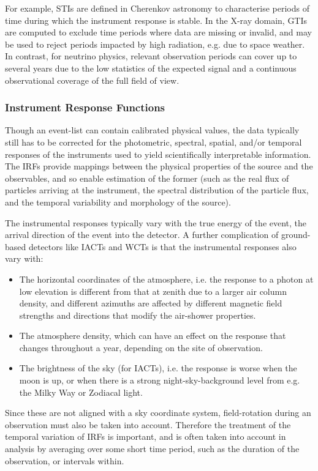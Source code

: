 \documentclass[11pt,a4paper]{ivoa}
\begin{document}
For example, \gls{STI}s are defined in Cherenkov astronomy to characterise periods of time during which the instrument response is stable. In the X-ray domain, \gls{GTI}s are computed to exclude time periods where data are missing or invalid, and may be used to reject periods impacted by high radiation, e.g. due to space weather. In contrast, for neutrino physics, relevant observation periods can cover up to several years due to the low statistics of the expected signal and a continuous observational coverage of the full field of view.


\subsubsection{Instrument Response Functions}

Though an event-list can contain calibrated physical values, the data typically still has to be corrected for the
photometric, spectral, spatial, and/or temporal responses of the instruments used to yield scientifically interpretable
information. The \gls{IRF}s provide mappings between the physical properties of the source and the observables, and so enable
estimation of the former (such as the real flux of particles arriving at the instrument, the spectral distribution of
the particle flux, and the temporal variability and morphology of the source).

The instrumental responses typically vary with the true energy of the event, the arrival direction of the event into the
detector. A further complication of ground-based detectors like \gls{IACT}s and WCTs is that the instrumental responses also vary with:
\begin{itemize}
  \item The horizontal coordinates of the atmosphere, i.e. the response to a photon at low elevation is different from that at zenith due to a larger air column density, and different azimuths are affected by different magnetic field strengths and directions that modify the air-shower properties.
  \item The atmosphere density, which can have an effect on the response that changes throughout a year, depending on the site of observation.
  \item The brightness of the sky (for \gls{IACT}s), i.e. the response is worse when the moon is up, or when there is a strong night-sky-background level from e.g. the Milky Way or Zodiacal light.
\end{itemize}
Since these are not aligned with a sky coordinate system, field-rotation during an observation must also be taken into account.
Therefore the treatment of the temporal variation of \gls{IRF}s is important, and is often taken into account in analysis by averaging over some short time period, such as the duration of the observation, or intervals within.
\end{document}
